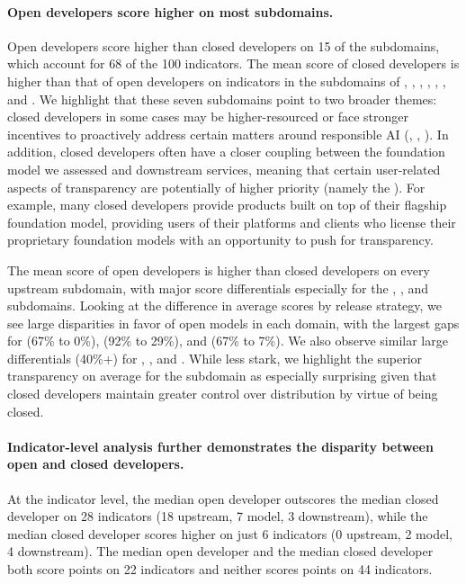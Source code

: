 \documentclass[screen, authorversion, acmsmall]{acmart}
\begin{document}
\paragraph{Open developers score higher on most subdomains.}
Open developers score higher than closed developers on 15 of the \numsubdomains subdomains, which account for 68 of the 100 indicators. 
The mean score of closed developers is higher than that of open developers on indicators in the subdomains of \capabilities, \risks, \modelmitigations, \trustworthiness, \usagepolicy, \modelbehaviorpolicy, and \documentation.
We highlight that these seven subdomains point to two broader themes: closed developers in some cases may be higher-resourced or face stronger incentives to proactively address certain matters around responsible AI (\eg \risks, \modelmitigations, \trustworthiness).
In addition, closed developers often have a closer coupling between the foundation model we assessed and downstream services, meaning that certain user-related aspects of transparency are potentially of higher priority (namely the \usagepolicy). 
For example, many closed developers provide products built on top of their flagship foundation model, providing users of their platforms and clients who license their proprietary foundation models with an opportunity to push for transparency.

The mean score of open developers is higher than closed developers on every upstream subdomain, with major score differentials especially for the \data, \compute, and \methods subdomains.
Looking at the difference in average scores by release strategy, we see large disparities in favor of open models in each domain, with the largest gaps for \dataaccess (67\% to 0\%), \methods (92\% to 29\%), and \datamitigations(67\% to 7\%).
We also observe similar large differentials (40\%+) for \modelbasics, \modelaccess, and \updates.
While less stark, we highlight the superior transparency on average for the \distribution subdomain as especially surprising given that closed developers maintain greater control over distribution by virtue of being closed.

\paragraph{Indicator-level analysis further demonstrates the disparity between open and closed developers.}
At the indicator level, the median open developer outscores the median closed developer on 28 indicators (18 upstream, 7 model, 3 downstream), while the median closed developer scores higher on just 6 indicators (0 upstream, 2 model, 4 downstream). 
The median open developer and the median closed developer both score points on 22 indicators and neither scores points on 44 indicators. 
\end{document}
